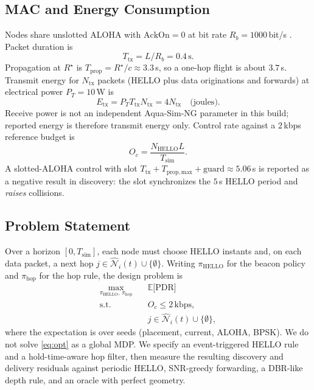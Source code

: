 \documentclass[journal]{IEEEtran}
\begin{document}
\subsection{MAC and Energy Consumption}
Nodes share unslotted ALOHA with $\mathrm{AckOn}=0$ at bit rate
$R_b=1000$\,bit/s \cite{aquasimng,liu2026lqarp}. Packet duration is
\begin{equation}
T_{\mathrm{tx}}=L/R_b=0.4\,\mathrm{s}.
\label{eq:ttx}
\end{equation}
Propagation at $R^{\star}$ is $T_{\mathrm{prop}}=R^{\star}/c\approx 3.3$\,s,
so a one-hop flight is about $3.7$\,s. Transmit energy for
$N_{\mathrm{tx}}$ packets (HELLO plus data originations and forwards)
at electrical power $P_T=10$\,W is
\begin{equation}
E_{\mathrm{tx}}=P_T T_{\mathrm{tx}} N_{\mathrm{tx}}=4N_{\mathrm{tx}}\quad\text{(joules).}
\label{eq:energy}
\end{equation}
Receive power is not an independent Aqua-Sim-NG parameter in this
build; reported energy is therefore transmit energy only.
Control rate against a $2$\,kbps reference budget is
\begin{equation}
O_{c}=\frac{N_{\mathrm{HELLO}}L}{T_{\mathrm{sim}}}.
\label{eq:oh}
\end{equation}
A slotted-ALOHA control with slot
$T_{\mathrm{tx}}+T_{\mathrm{prop,max}}+\mathrm{guard}\approx 5.06$\,s
is reported as a negative result in discovery: the slot synchronizes
the $5$\,s HELLO period and \emph{raises} collisions.

\subsection{Problem Statement}
Over a horizon $[0,T_{\mathrm{sim}}]$, each node must choose HELLO
instants and, on each data packet, a next hop
$j\in\widehat{\mathcal{N}}_i(t)\cup\{\emptyset\}$.
Writing $\pi_{\mathrm{HELLO}}$ for the beacon policy and
$\pi_{\mathrm{hop}}$ for the hop rule, the design problem is
\begin{equation}
\begin{aligned}
\max_{\pi_{\mathrm{HELLO}},\,\pi_{\mathrm{hop}}}\quad
&\mathbb{E}\bigl[\mathrm{PDR}\bigr] \\
\mathrm{s.t.}\quad
& O_c\le 2\,\mathrm{kbps}, \\
& j\in\widehat{\mathcal{N}}_i(t)\cup\{\emptyset\},
\end{aligned}
\label{eq:opt}
\end{equation}
where the expectation is over seeds (placement, current, ALOHA, BPSK).
We do not solve \eqref{eq:opt} as a global MDP. We specify an
event-triggered HELLO rule and a hold-time-aware hop filter, then
measure the resulting discovery and delivery residuals against
periodic HELLO, SNR-greedy forwarding, a DBR-like depth rule, and an
oracle with perfect geometry.
\end{document}
